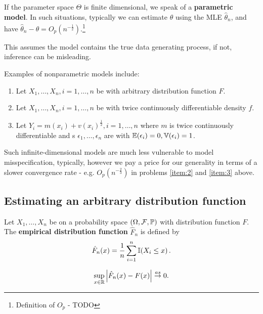If the parameter space $\Theta$ is finite dimensional, we speak of a
\textbf{parametric model}.  In such situations, typically we can
estimate $\theta$ using the MLE $\hat \theta_{n}$, and have $\hat
\theta_{n} - \theta = O_{p}(n^{-\frac{1}{2}})$.\footnote{Definition of
  $O_{p}$ - TODO}

This assumes the model contains the true data generating process, if
not, inference can be misleading.

Examples of nonparametric models include:
\begin{enumerate}
\item \label{item:1} Let $X_{1}, \dots, X_{n}, i = 1, \dots, n$ be
  \iid with arbitrary distribution function $F$.
\item \label{item:2} Let $X_{1}, \dots, X_{n}, i = 1, \dots, n$ be
  \iid with twice continuously differentiable density $f$.
\item \label{item:3} Let $Y_{i} = m(x_{i}) + v(x_{i})^{\frac{1}{2}}, i
  = 1, \dots, n$ where $m$ is twice continuously differentiable and
s  $\epsilon_{1}, \dots, \epsilon_{n}$ are \iid with $\E{\epsilon_{i}}
  = 0, \Var{\epsilon_{i}} = 1$.
\end{enumerate}

Such infinite-dimensional models are much less vulnerable to model
misspecification, typically, however we pay a price for our generality
in terms of a slower convergence rate - e.g. $O_{p}(n^{-\frac{2}{3}})$
in problems \ref{item:2} and \ref{item:3} above.

\subsection{Estimating an arbitrary distribution function}
\label{sec:estim-an-arbitr}

Let $X_{1}, \dots, X_{n}$ be \iid on a probability space $(\Omega,
\mathcal{F}, \Prob)$ with distribution function $F$.  The
\textbf{empirical distribution function} $\hat F_{n}$ is defined by
\begin{equation}
  \label{eq:1}
  \hat F_{n}(x) = \frac{1}{n} \sum_{i=1}^{n} \I{X_{i} \leq x}.
\end{equation}


\begin{thm}
  \label{defn:Introduction:2}
  \begin{equation}
    \label{eq:2}
    \sup_{x \in \mathbb{R}} \left| \hat F_{n}(x) - F(x) \right| \overset{as}{\rightarrow} 0.
  \end{equation}
\end{thm}

